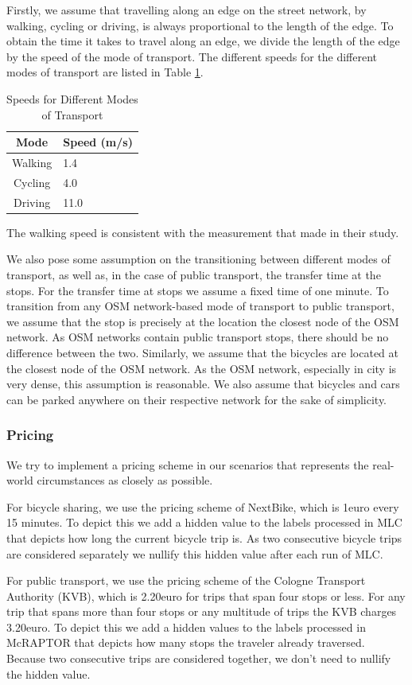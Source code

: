 Firstly, we assume that travelling along an edge on the street network, by walking, cycling or driving, is always proportional to the length of the edge.
To obtain the time it takes to travel along an edge, we divide the length of the edge by the speed of the mode of transport.
The different speeds for the different modes of transport are listed in Table \ref{table:speeds}.

\begin{table}[h]
\centering
\begin{tabular}{|c|l|}
\hline
\textbf{Mode} & \textbf{Speed (m/s)} \\
\hline
Walking & 1.4 \\
\hline
Cycling & 4.0 \\
\hline
Driving & 11.0 \\
\hline
\end{tabular}
\caption{Speeds for Different Modes of Transport}
\label{table:speeds}
\end{table}

The walking speed is consistent with the measurement that  made in their study.

We also pose some assumption on the transitioning between different modes of transport, as well as, in the case of public transport, the transfer time at the stops.
For the transfer time at stops we assume a fixed time of one minute.
To transition from any OSM network-based mode of transport to public transport, we assume that the stop is precisely at the location the closest node of the OSM network.
As OSM networks contain public transport stops, there should be no difference between the two.
Similarly, we assume that the bicycles are located at the closest node of the OSM network.
As the OSM network, especially in city is very dense, this assumption is reasonable.
We also assume that bicycles and cars can be parked anywhere on their respective network for the sake of simplicity.


\subsubsection{Pricing}
\label{subs:pricing}

We try to implement a pricing scheme in our scenarios that represents the real-world circumstances as closely as possible.

For bicycle sharing, we use the pricing scheme of NextBike, which is 1euro every 15 minutes.
To depict this we add a hidden value to the labels processed in MLC that depicts how long the current bicycle trip is.
As two consecutive bicycle trips are considered separately we nullify this hidden value after each run of MLC.

For public transport, we use the pricing scheme of the Cologne Transport Authority (KVB), which is 2.20euro for trips that span four stops or less.
For any trip that spans more than four stops or any multitude of trips the KVB charges 3.20euro.
To depict this we add a hidden values to the labels processed in McRAPTOR that depicts how many stops the traveler already traversed.
Because two consecutive trips are considered together, we don't need to nullify the hidden value.

